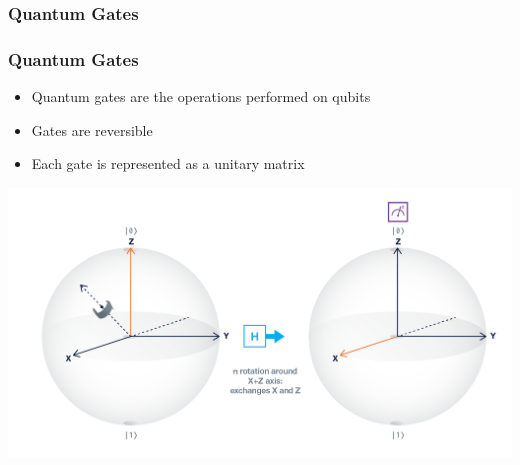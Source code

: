 \documentclass[aspectratio=169,11pt,hyperref={colorlinks=true}]{beamer}
\begin{document}
\subsubsection{Quantum Gates}
\begin{frame}
    \frametitle{Quantum Gates}
    \begin{itemize}
        \item Quantum gates are the operations performed on qubits
        \item Gates are reversible
        \item Each gate is represented as a unitary matrix
    \end{itemize}
    \centering
    \includegraphics[width=.85\textwidth]{gate_h_bloch.png}
\end{frame}
\end{document}
